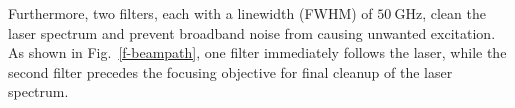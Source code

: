 \documentclass[aps,prl,twocolumn,10pt,superscriptaddress]{revtex4-1}
\newcounter{TRC}
\newcommand{\TR}[1]{\textcolor{violet}{[[\stepcounter{TRC} TR\arabic{TRC}: #1]]}}
\begin{document}
Furthermore, two filters, each with a linewidth (FWHM) of $50~\mathrm{GHz}$,
clean the laser spectrum and prevent broadband noise from causing unwanted excitation.
As shown in Fig.~\ref{f-beampath}, one filter immediately follows the laser, while the second filter precedes the focusing objective for final cleanup of the laser spectrum.





\end{document}
